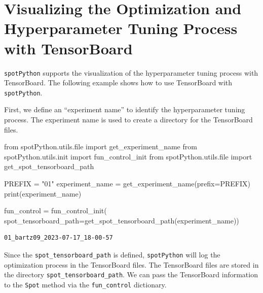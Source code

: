 \documentclass[
  letterpaper,
  DIV=11,
  numbers=noendperiod]{scrreprt}
\newenvironment{Shaded}{\begin{snugshade}}{\end{snugshade}}
\newcommand{\BuiltInTok}[1]{\textcolor[rgb]{0.00,0.23,0.31}{#1}}
\newcommand{\ImportTok}[1]{\textcolor[rgb]{0.00,0.46,0.62}{#1}}
\newcommand{\NormalTok}[1]{\textcolor[rgb]{0.00,0.23,0.31}{#1}}
\newcommand{\OperatorTok}[1]{\textcolor[rgb]{0.37,0.37,0.37}{#1}}
\newcommand{\StringTok}[1]{\textcolor[rgb]{0.13,0.47,0.30}{#1}}
\begin{document}
\hypertarget{sec-visualizing-tensorboard-01}{%
\section{Visualizing the Optimization and Hyperparameter Tuning Process
with TensorBoard}\label{sec-visualizing-tensorboard-01}}

\texttt{spotPython} supports the visualization of the hyperparameter
tuning process with TensorBoard. The following example shows how to use
TensorBoard with \texttt{spotPython}.

First, we define an ``experiment name'' to identify the hyperparameter
tuning process. The experiment name is used to create a directory for
the TensorBoard files.

\begin{Shaded}
\begin{Highlighting}[]
\ImportTok{from}\NormalTok{ spotPython.utils.}\BuiltInTok{file} \ImportTok{import}\NormalTok{ get\_experiment\_name}
\ImportTok{from}\NormalTok{ spotPython.utils.init }\ImportTok{import}\NormalTok{ fun\_control\_init}
\ImportTok{from}\NormalTok{ spotPython.utils.}\BuiltInTok{file} \ImportTok{import}\NormalTok{ get\_spot\_tensorboard\_path}

\NormalTok{PREFIX }\OperatorTok{=} \StringTok{"01"}
\NormalTok{experiment\_name }\OperatorTok{=}\NormalTok{ get\_experiment\_name(prefix}\OperatorTok{=}\NormalTok{PREFIX)}
\BuiltInTok{print}\NormalTok{(experiment\_name)}

\NormalTok{fun\_control }\OperatorTok{=}\NormalTok{ fun\_control\_init(}
\NormalTok{    spot\_tensorboard\_path}\OperatorTok{=}\NormalTok{get\_spot\_tensorboard\_path(experiment\_name))}
\end{Highlighting}
\end{Shaded}

\begin{verbatim}
01_bartz09_2023-07-17_18-00-57
\end{verbatim}

Since the \texttt{spot\_tensorboard\_path} is defined,
\texttt{spotPython} will log the optimization process in the TensorBoard
files. The TensorBoard files are stored in the directory
\texttt{spot\_tensorboard\_path}. We can pass the TensorBoard
information to the \texttt{Spot} method via the \texttt{fun\_control}
dictionary.
\end{document}
